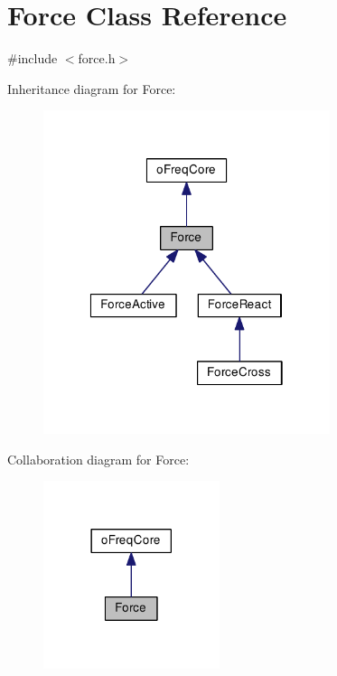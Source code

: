 \hypertarget{class_force}{\section{Force Class Reference}
\label{class_force}
}


{\ttfamily \#include $<$force.\-h$>$}



Inheritance diagram for Force\-:\nopagebreak
\begin{figure}[H]
\begin{center}
\leavevmode
\includegraphics[width=238pt]{class_force__inherit__graph}
\end{center}
\end{figure}


Collaboration diagram for Force\-:\nopagebreak
\begin{figure}[H]
\begin{center}
\leavevmode
\includegraphics[width=146pt]{class_force__coll__graph}
\end{center}
\end{figure}
